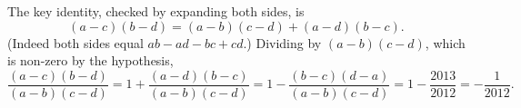 The key identity, checked by expanding both sides, is
\[
(a-c)(b-d)=(a-b)(c-d)+(a-d)(b-c).
\]
(Indeed both sides equal $ab-ad-bc+cd$.) Dividing by $(a-b)(c-d)$, which is non-zero by the hypothesis,
\[
\dfrac{(a-c)(b-d)}{(a-b)(c-d)}=1+\dfrac{(a-d)(b-c)}{(a-b)(c-d)}=1-\dfrac{(b-c)(d-a)}{(a-b)(c-d)}=1-\dfrac{2013}{2012}=\boxed{-\dfrac{1}{2012}}.
\]
